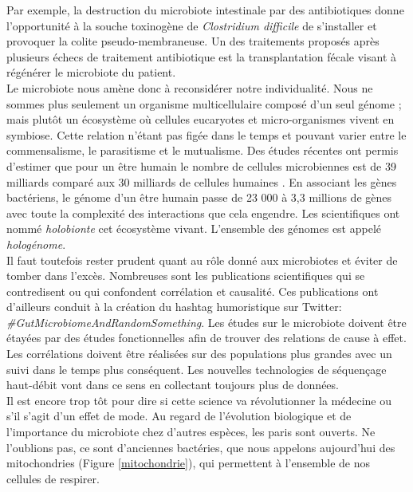 \documentclass[12pt,a4paper]{article}
\begin{document}
Par exemple, la destruction du microbiote intestinale par des antibiotiques donne l'opportunité à la souche toxinogène de \textit{Clostridium difficile} de s'installer et provoquer la colite pseudo-membraneuse. Un des traitements proposés après plusieurs échecs de traitement antibiotique est la transplantation fécale visant à régénérer le microbiote du patient. \\
Le microbiote nous amène donc à reconsidérer notre individualité. Nous ne sommes plus seulement un organisme multicellulaire composé d'un seul génome ; mais plutôt un écosystème où cellules eucaryotes et micro-organismes vivent en symbiose. Cette relation n'étant pas figée dans le temps et pouvant varier entre le commensalisme, le parasitisme et le mutualisme. Des études récentes ont permis d'estimer que pour un être humain le nombre de cellules microbiennes est de 39 milliards comparé aux 30 milliards de cellules humaines \cite{Sender2016}. En associant les gènes bactériens, le génome d’un être humain passe de 23 000  à 3,3 millions de gènes \cite{Qin2010} avec toute la complexité des interactions que cela engendre. Les scientifiques ont nommé \textit{holobionte} cet écosystème vivant. L'ensemble des génomes est appelé \textit{hologénome}. \\
Il faut toutefois rester prudent quant au rôle donné aux microbiotes et éviter de tomber dans l'excès. Nombreuses sont les publications scientifiques qui se contredisent ou qui confondent corrélation et causalité. Ces publications ont d'ailleurs conduit à la création du hashtag humoristique sur Twitter: \textit{\#GutMicrobiomeAndRandomSomething}. 
Les études sur le microbiote doivent être étayées par des études fonctionnelles afin de trouver des relations de cause à effet. Les corrélations doivent être réalisées sur des populations plus grandes avec un suivi dans le temps plus conséquent. Les nouvelles technologies de séquençage haut-débit vont dans ce sens en collectant toujours plus de données.\\
Il est encore trop tôt pour dire si cette science va révolutionner la médecine ou s’il s'agit d'un effet de mode. Au regard de l'évolution biologique et de l'importance du microbiote chez d'autres espèces, les paris sont ouverts. Ne l'oublions pas, ce sont d'anciennes bactéries, que nous appelons aujourd'hui des mitochondries (Figure \ref{mitochondrie}), qui permettent à l'ensemble de nos cellules de respirer. 
\end{document}
